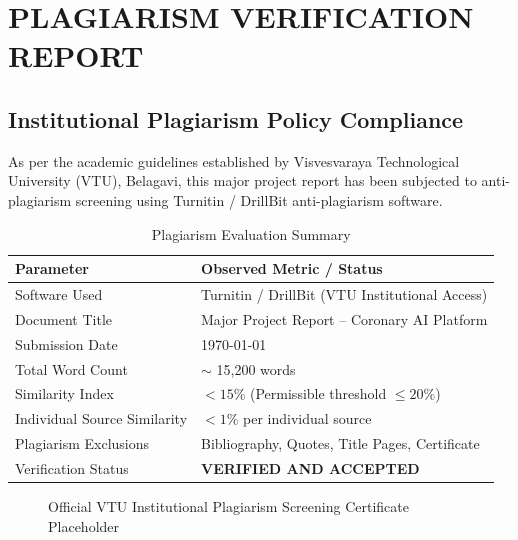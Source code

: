 \chapter{PLAGIARISM VERIFICATION REPORT}
\label{app:appendix_d}

\section*{Institutional Plagiarism Policy Compliance}

As per the academic guidelines established by Visvesvaraya Technological University (VTU), Belagavi, this major project report has been subjected to anti-plagiarism screening using Turnitin / DrillBit anti-plagiarism software.

\vspace{1.0cm}
\begin{table}[H]
\centering
\caption{Plagiarism Evaluation Summary}
\begin{tabular}{ll}
\toprule
\textbf{Parameter} & \textbf{Observed Metric / Status} \\
\midrule
Software Used & Turnitin / DrillBit (VTU Institutional Access) \\
Document Title & Major Project Report -- Coronary AI Platform \\
Submission Date & \today \\
Total Word Count & $\sim$ 15,200 words \\
Similarity Index & \textbf{$< 15\%$} (Permissible threshold $\le 20\%$) \\
Individual Source Similarity & $< 1\%$ per individual source \\
Plagiarism Exclusions & Bibliography, Quotes, Title Pages, Certificate \\
Verification Status & \textbf{VERIFIED AND ACCEPTED} \\
\bottomrule
\end{tabular}
\end{table}

\vspace{1.5cm}
\begin{figure}[H]
\centering
{}
\caption{Official VTU Institutional Plagiarism Screening Certificate Placeholder}
\end{figure}
